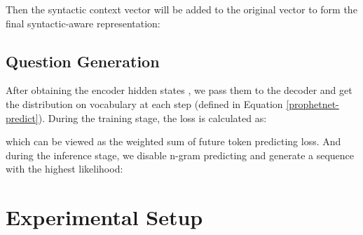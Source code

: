 \documentclass[11pt]{article}
\begin{document}
Then the syntactic context vector will be added to the original vector to form the final syntactic-aware representation:



\subsection{Question Generation}
After obtaining the encoder hidden states , we pass them to the decoder and get the distribution on vocabulary at each step (defined in Equation \ref{prophetnet-predict}). During the training stage, the loss is calculated as:

which can be viewed as the weighted sum of  future token predicting loss. And during the inference stage, we disable n-gram predicting and generate a sequence with the highest likelihood:



\section{Experimental Setup}
\end{document}
